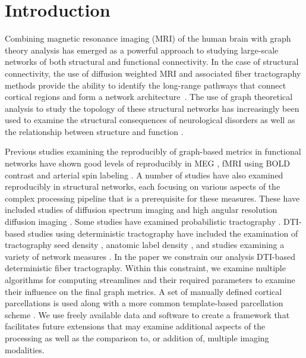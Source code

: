 \documentclass{frontiersSCNS} %
\begin{document}
\section{Introduction}
Combining magnetic resonance imaging (MRI) of the human brain with graph
theory analysis has emerged as a powerful approach to studying
large-scale networks of both structural and functional
connectivity. In the case of structural connectivity, the use of diffusion weighted MRI and
associated fiber tractography methods provide the ability to identify
the long-range pathways that connect cortical regions and form a
network architecture~\citep{Basser2000,Lazar2003,Hagmann2003,Mori1999}. 
The use of graph theoretical analysis to study
the topology of these structural networks has increasingly been used to
examine the structural consequences of neurological disorders \citep{Xie2012,Basset2012}
as well as the relationship between structure and function \citep{}. 

Previous studies examining the reproducibly of graph-based metrics in
functional networks have shown good levels of reproducibly in MEG
\citep{Deuker2009}, fMRI using BOLD contrast
\citep{Telesford2010,Braun2012,Schwarz2011,Liang2012,Weber2013} and
arterial spin labeling \citep{Weber2013}. A number of studies have also examined
reproducibly in structural networks, each focusing on various aspects
of the complex processing pipeline that is a prerequisite for these
measures. These have included studies of diffusion spectrum imaging
\citep{Cammoun2012,Bassett2011N} and high angular resolution diffusion
imaging \citep{Dennis2012}. Some studies have examined probabilistic
tractography \citep{Owen2013BC,Vaessen2010}. DTI-based studies using
deterministic tractography have included the examination of
tractography seed density \citep{Cheng2012N}, anatomic label density
\citep{Bassett2011N}, and studies examining a variety of network
measures \citep{Cheng2012N,Irimia2012N}. In the paper we constrain our
analysis DTI-based deterministic fiber
tractography. Within this constraint, we examine multiple algorithms
for computing streamlines and their required parameters to examine
their influence on the final graph metrics. A set of manually defined
cortical parcellations \citep{Klein2012} is used along with a more common template-based
parcellation scheme \citep{AAL}. We use freely
available data and software to create a framework that facilitates future extensions
that may examine additional aspects of the processing as well as the
comparison to, or addition of, multiple imaging modalities. 
\end{document}
